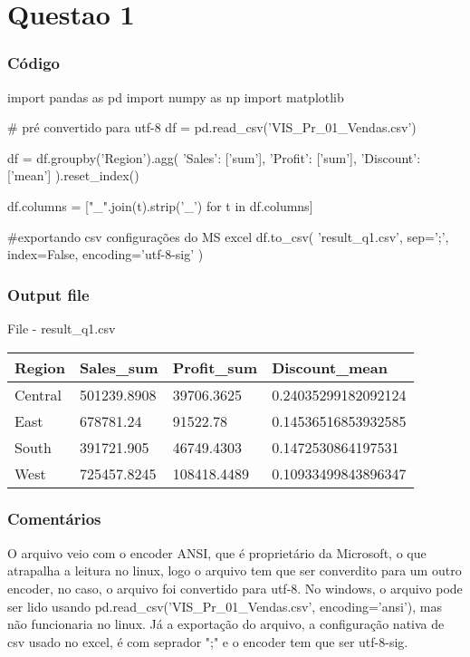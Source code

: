 \chapter{Questao 1}

\subsection*{Código}

\begin{python}
import pandas as pd
import numpy as np
import matplotlib

# pré convertido para utf-8
df = pd.read_csv('VIS_Pr_01_Vendas.csv')

df = df.groupby('Region').agg(
    {
        'Sales': ['sum'],
        'Profit': ['sum'],
        'Discount': ['mean']     
    }
).reset_index()


df.columns = ["_".join(t).strip('_') for t in df.columns]

#exportando csv configurações do MS excel
df.to_csv(
    'result_q1.csv',
    sep=';',
    index=False,
    encoding='utf-8-sig'
)
\end{python}

\subsection*{Output file}


\begin{quadro}[htb]
	\caption{File - result\_q1.csv }
    \begin{tabular}{|l|l|l|l|}
		\hline
        Region & Sales\_sum & Profit\_sum & Discount\_mean \\ \hline
        Central&501239.8908&39706.3625&0.24035299182092124 \\ \hline
        East&678781.24&91522.78&0.14536516853932585 \\ \hline
        South&391721.905&46749.4303&0.1472530864197531 \\ \hline
        West&725457.8245&108418.4489&0.10933499843896347 \\ \hline
	\end{tabular}
	\end{quadro}

\subsection*{Comentários}
 O arquivo veio com o encoder ANSI, que é proprietário da Microsoft, o que atrapalha a leitura no linux, logo o arquivo tem que ser converdito para um outro encoder,
 no caso, o arquivo foi convertido para utf-8.
 No windows, o arquivo pode ser lido usando pd.read_csv('VIS_Pr_01_Vendas.csv', encoding='ansi'), mas não funcionaria no linux.
 Já a exportação do arquivo, a configuração nativa de csv usado no excel, é com seprador ";" e o encoder tem que ser utf-8-sig.